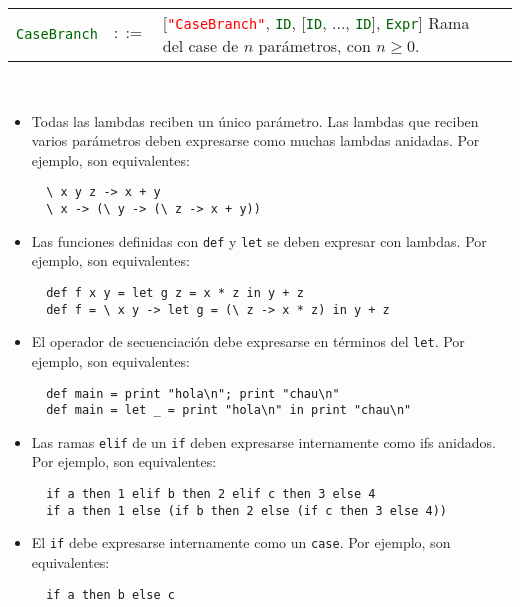 \documentclass{article}
\newcommand{\type}[1]{\textcolor{darkgreen}{\texttt{#1}}}
\newcommand{\datadecl}[2]{\noindent
  \begin{tabularx}{\textwidth}{lrp{13cm}r}
  #1 & $::=$ & #2
  \end{tabularx}\\
}
\newcommand{\fl}[1]{\texttt{#1}}
\newcommand{\astkw}[1]{\texttt{\textcolor{red}{"#1"}}}
\begin{document}
\datadecl{\type{CaseBranch}}{
  [\astkw{CaseBranch}, \type{ID}, [\type{ID}, $\hdots$, \type{ID}], \type{Expr}]
  \hfill {\small Rama del case de $n$ parámetros, con $n \geq 0$.}
}

\begin{itemize}
\item
  Todas las lambdas reciben un único parámetro.
  Las lambdas que reciben varios parámetros deben expresarse como
  muchas lambdas anidadas. Por ejemplo, son equivalentes:
  \begin{verbatim}
  \ x y z -> x + y
  \ x -> (\ y -> (\ z -> x + y))
  \end{verbatim}
\item
  Las funciones definidas con \fl{def} y \fl{let} se deben expresar
  con lambdas. Por ejemplo, son equivalentes:
  \begin{verbatim}
  def f x y = let g z = x * z in y + z
  def f = \ x y -> let g = (\ z -> x * z) in y + z
  \end{verbatim}
\item
  El operador de secuenciación debe expresarse en términos del \fl{let}.
  Por ejemplo, son equivalentes:
  \begin{verbatim}
  def main = print "hola\n"; print "chau\n"
  def main = let _ = print "hola\n" in print "chau\n"
  \end{verbatim}
\item
  Las ramas \fl{elif} de un \fl{if} deben expresarse internamente
  como ifs anidados. Por ejemplo, son equivalentes:
  \begin{verbatim}
  if a then 1 elif b then 2 elif c then 3 else 4
  if a then 1 else (if b then 2 else (if c then 3 else 4))
  \end{verbatim}
\item
  El \fl{if} debe expresarse internamente como un \fl{case}.
  Por ejemplo, son equivalentes:
  \begin{verbatim}
  if a then b else c


\end{verbatim}
\end{itemize}
\end{document}
